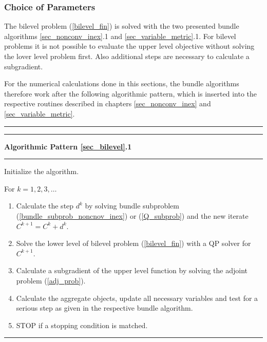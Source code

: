 \subsubsection{Choice of Parameters}

The bilevel problem (\ref{bilevel_fin}) is solved with the two presented bundle algorithms \ref{sec_nonconv_inex}.1 and \ref{sec_variable_metric}.1.
For bilevel problems it is not possible to evaluate the upper level objective without solving the lover level problem first. Also additional steps are necessary to calculate a subgradient.

For the numerical calculations done in this sections, the bundle algorithms therefore work after the following algorithmic pattern, which is inserted into the respective routines described in chapters \ref{sec_nonconv_inex} and \ref{sec_variable_metric}.

\begin{minipage}\linewidth
\vspace{1em}
\hrule  \vspace{0.4ex} \hrule
\vspace{1ex}
\textbf{Algorithmic Pattern \ref{sec_bilevel}.1}
\vspace{1ex}
\hrule
\vspace{1ex}
Initialize the algorithm.
\end{minipage}

For \(k = 1,2,3,  \dotsc \)   

\begin{enumerate}
	\item Calculate the step \(d^k\) by solving bundle subproblem (\ref{bundle_subprob_noncnov_inex}) or (\ref{Q_subprob}) and the new iterate \(C^{k+1} = C^k+d^k\).
		\item Solve the lower level of bilevel problem (\ref{bilevel_fin}) with a QP solver for \(C^{k+1}\). 
	\item Calculate a subgradient of the upper level function by solving the adjoint problem (\ref{adj_prob}).
	\item Calculate the aggregate objects, update all necessary variables and test for a serious step as given in the respective bundle algorithm.
	\item STOP if a stopping condition is matched.
\end{enumerate}
\vspace{1ex}
\hrule

\vspace{1.5em}

